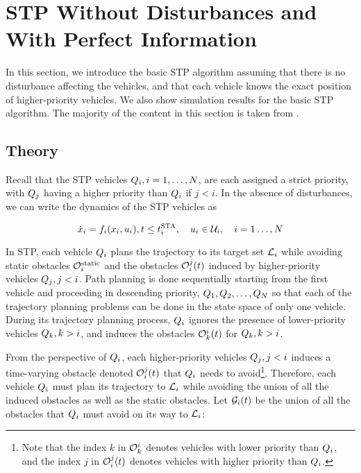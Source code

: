 \section{STP Without Disturbances and With Perfect Information\label{sec:basic}}
In this section, we introduce the basic STP algorithm assuming that there is no disturbance affecting the vehicles, and that each vehicle knows the exact position of higher-priority vehicles.  We also show simulation results for the basic STP algorithm. The majority of the content in this section is taken from \cite{Chen15c}.

\subsection{Theory}
Recall that the STP vehicles $Q_i, i=1,\ldots,N$, are each assigned a strict priority, with $Q_j$ having a higher priority than $Q_i$ if $j<i$. In the absence of disturbances, we can write the dynamics of the STP vehicles as

\begin{equation}
\label{eq:dyn_no_dstb}
\dot\state_i = \fdyn_i(\state_i, \ctrl_i), t \le \sta_i, \quad \ctrl_i \in \cset_i, \quad i = 1 \ldots, \N
\end{equation}


In STP, each vehicle $Q_i$ plans the trajectory to its target set $\mathcal{L}_i$ while avoiding static obstacles $\mathcal{O}^\text{static}_i$ and the obstacles $\mathcal{O}_i^j(t)$ induced by higher-priority vehicles $Q_j, j<i$. Path planning is done sequentially starting from the first vehicle and proceeding in descending priority, $Q_1, Q_2, \ldots, Q_{N}$ so that each of the trajectory planning problems can be done in the state space of only one vehicle. During its trajectory planning process, $Q_i$ ignores the presence of lower-priority vehicles $Q_k, k>i$, and induces the obstacles $\mathcal{O}_k^i(t)$ for $Q_k, k>i$.

From the perspective of $Q_i$, each higher-priority vehicles $Q_j, j<i$ induces a time-varying obstacle denoted $\mathcal{O}_i^j(t)$ that $Q_i$ needs to avoid\footnote{Note that the index $k$ in $\mathcal{O}_k^i$ denotes vehicles with lower priority than $Q_i$, and the index $j$ in $\mathcal{O}_i^j(t)$ denotes vehicles with higher priority than $Q_i$.}. Therefore, each vehicle $Q_i$ must plan its trajectory to $\mathcal{L}_i$ while avoiding the union of all the induced obstacles as well as the static obstacles. Let $\mathcal{G}_i(t)$ be the union of all the obstacles that $Q_i$ must avoid on its way to $\mathcal{L}_i$:

